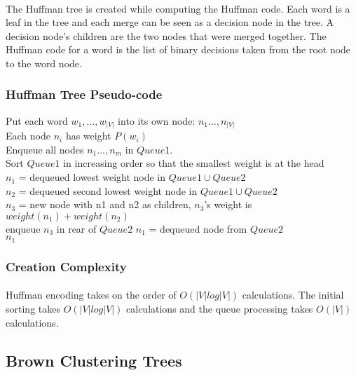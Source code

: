 \paragraph{}
The Huffman tree is created while computing the Huffman code. Each word is a leaf in the tree and each merge can be seen as a decision node in the tree. A decision node's children are the two nodes that were merged together. The Huffman code for a word is the list of binary decisions taken from the root node to the word node.

\subsubsection{Huffman Tree Pseudo-code}

\begin{algorithm}[H]
\SetAlgoLined
Put each word $w_1,\dots,w_{|V|}$ into its own node: $n_1\dots,n_{|V|}$
\\ Each node $n_i$ has weight $P(w_i)$
\\Enqueue all nodes $n_1\dots,n_m$ in $Queue1$.
\\Sort $Queue1$ in increasing order so that the smallest weight is at the head
\\  {
	$n_1$ = dequeued lowest weight node in $Queue1 \cup Queue2$
	\\$n_2$ = dequeued second lowest weight node in $Queue1 \cup Queue2$
	\\$n_3$ = new node with n1 and n2 as children,  $n_3$'s weight is $weight(n_1)+weight(n_2)$
	\\enqueue $n_3$ in rear of $Queue2$
}
$n_1$ = dequeued node from $Queue2$
\\ \Return $n_1$
\end{algorithm}

\subsubsection{Creation Complexity}
\paragraph{}
Huffman encoding takes on the order of $O\left(|V| log |V| \right)$ calculations. The initial sorting takes $O\left(|V| log |V|\right)$ calculations and the queue processing takes $O(|V|)$ calculations.

\subsection{Brown Clustering Trees}
